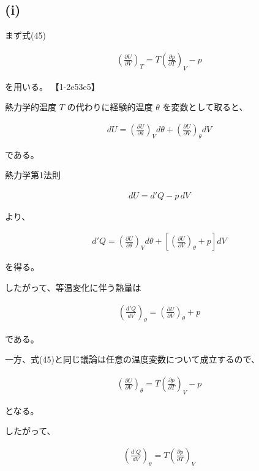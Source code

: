 \documentclass[platex,dvipdfmx,a4paper]{jsarticle}
\begin{document}
\subsection{(i)}

まず式(45)

\begin{align*}
\left(
\frac{\partial U}{\partial V}
\right)_T
=
T
\left(
\frac{\partial p}{\partial T}
\right)_V
-p
\end{align*}

を用いる。 【1-2e53e5】

熱力学的温度 $T$ の代わりに経験的温度 $\theta$ を変数として取ると、

\begin{align*}
dU
=
\left(
\frac{\partial U}{\partial \theta}
\right)_V d\theta
+
\left(
\frac{\partial U}{\partial V}
\right)_\theta dV
\end{align*}

である。

熱力学第1法則

\begin{align*}
dU=d'Q-p\,dV
\end{align*}

より、

\begin{align*}
d'Q
=
\left(
\frac{\partial U}{\partial \theta}
\right)_V d\theta
+
\left[
\left(
\frac{\partial U}{\partial V}
\right)_\theta
+p
\right]dV
\end{align*}

を得る。

したがって、等温変化に伴う熱量は

\begin{align*}
\left(
\frac{d'Q}{dV}
\right)_\theta
=
\left(
\frac{\partial U}{\partial V}
\right)_\theta
+p
\end{align*}

である。

一方、式(45)と同じ議論は任意の温度変数について成立するので、

\begin{align*}
\left(
\frac{\partial U}{\partial V}
\right)_\theta
=
T
\left(
\frac{\partial p}{\partial T}
\right)_V
-p
\end{align*}

となる。

したがって、

\begin{align*}
\left(
\frac{d'Q}{dV}
\right)_\theta
=
T
\left(
\frac{\partial p}{\partial T}
\right)_V
\end{align*}
\end{document}
